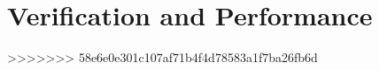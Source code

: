 \documentclass[x11names,twoside,english]{uiofysmaster}
\begin{document}
\chapter{Verification and Performance}
%     
%     
%     
%     
    
>>>>>>> 58e6e0e301c107af71b4f4d78583a1f7ba26fb6d

%   
%
%   
%
%   
%
%     
%
%     
%
%     
%
%     
%
%     
%     

%     


%
\end{document}
